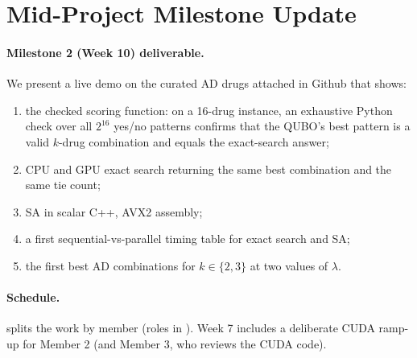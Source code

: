 \section{Mid-Project Milestone Update}
\label{sec:milestones}

\paragraph{Milestone 2 (Week 10) deliverable.} We present a live demo on the curated AD drugs attached in Github that shows:
\begin{enumerate}
\item the checked scoring function: on a 16-drug instance, an exhaustive Python check over all $2^{16}$ yes/no patterns confirms that the QUBO's best pattern is a valid $k$-drug combination and equals the exact-search answer;
\item CPU and GPU exact search returning the same best combination and the same tie count;
\item SA in scalar C++, AVX2 assembly;
\item a first sequential-vs-parallel timing table for exact search and SA;
\item the first best AD combinations for $k\in\{2,3\}$ at two values of $\lambda$.
\end{enumerate}

\paragraph{Schedule.}  splits the work by member (roles in ). Week 7 includes a deliberate CUDA ramp-up for Member 2 (and Member 3, who reviews the CUDA code).

